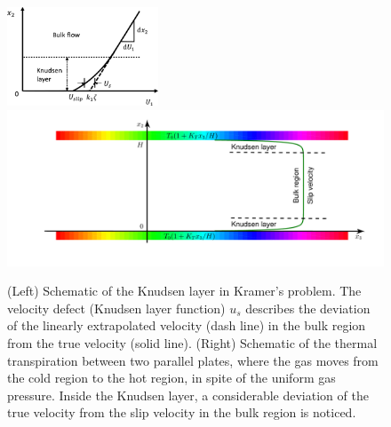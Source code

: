 \begin{figure}[t]
	\centering
	\vskip 0.3cm
	\centering
	\includegraphics[width=0.4\textwidth]{SlipJump/IMG/kramer}
	\quad
	\includegraphics[scale=0.35,viewport=280 50 820 350,clip=true]{SlipJump/IMG/Demo_thermalTranspiration}
	\caption{
		(Left) Schematic of the Knudsen layer in Kramer’s problem. The velocity defect (Knudsen layer function) $u_s$ describes the deviation of the linearly extrapolated velocity (dash line) in the bulk region from the true velocity (solid line). %
	 (Right) Schematic of the thermal transpiration between two parallel plates, where the gas moves from the cold region to the hot region, in spite of the uniform gas pressure. Inside the Knudsen layer, a considerable deviation of the true velocity from the slip velocity in the bulk region is noticed.
}
	\label{fig:kramers_dia}
\end{figure}




